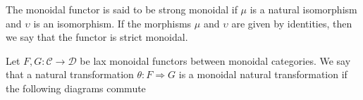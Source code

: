 \documentclass[../thesis.tex]{subfiles}
\begin{document}
        The monoidal functor is said to be strong monoidal if $\mu$ is a natural isomorphism and $\upsilon$ is an isomorphism. If the morphisms $\mu$ and $\upsilon$ are given by identities, then we say that the functor is strict monoidal.

        \begin{definition}
            Let $F, G: \mathcal{C} \rightarrow \mathcal{D}$ be lax monoidal functors between monoidal categories. We say that a natural transformation $\theta: F \Rightarrow G$ is a monoidal natural transformation if the following diagrams commute
            \begin{center}
                \quad
            \end{center}
        \end{definition}
\end{document}
